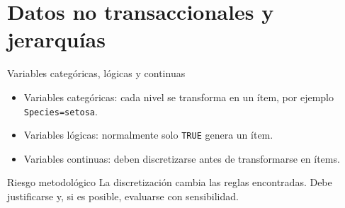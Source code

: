\documentclass[10pt,aspectratio=169]{beamer}
\begin{document}
%
%
%
%

\section{Datos no transaccionales y jerarquías}

\begin{frame}{Variables categóricas, lógicas y continuas}
\begin{itemize}
  \item Variables categóricas: cada nivel se transforma en un ítem, por ejemplo \texttt{Species=setosa}.
  \item Variables lógicas: normalmente solo \texttt{TRUE} genera un ítem.
  \item Variables continuas: deben discretizarse antes de transformarse en ítems.
\end{itemize}

\begin{block}{Riesgo metodológico}
La discretización cambia las reglas encontradas. Debe justificarse y, si es posible, evaluarse con sensibilidad.
\end{block}
\end{frame}
\end{document}
